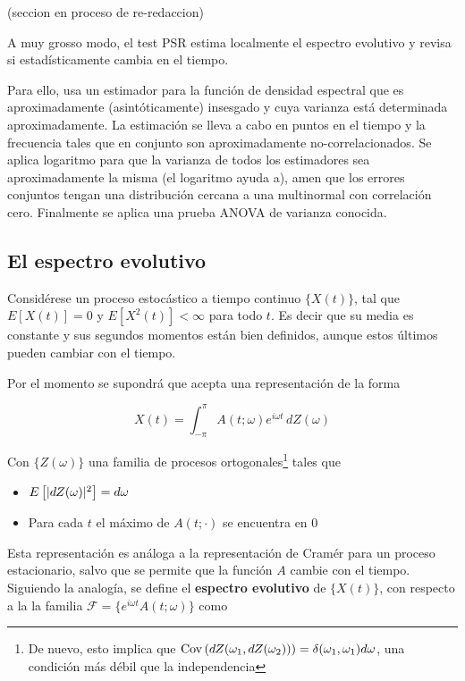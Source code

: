 (seccion en proceso de re-redaccion)

A muy grosso modo, el test PSR estima localmente  el espectro evolutivo
 y revisa si estad\'isticamente
cambia en el tiempo.

Para ello, usa un estimador para la funci\'on de densidad espectral
que es aproximadamente (asint\'oticamente) insesgado y cuya varianza est\'a
determinada aproximadamente. La estimaci\'on se lleva a cabo en puntos en el tiempo y
la frecuencia tales que en conjunto son aproximadamente no-correlacionados.
Se aplica logaritmo para que la varianza de todos los estimadores sea aproximadamente
la misma (el logaritmo ayuda a), amen que los errores conjuntos tengan una
distribuci\'on cercana a una multinormal con correlaci\'on cero.
Finalmente se aplica una prueba ANOVA de varianza conocida.


\subsection{El espectro evolutivo}

Consid\'erese un proceso estoc\'astico a tiempo continuo $\{X(t)\}$, tal que
$E[X(t)]=0$ y $E\left[ X^{2}(t)\right] < \infty$ para todo $t$. Es decir que su media es constante
y sus segundos momentos est\'an bien definidos, aunque 
estos \'ultimos pueden cambiar con el tiempo.

Por el momento se supondr\'a que acepta una representaci\'on de la forma

\begin{equation*}
X(t) = \int_{-\pi}^{\pi} A(t ; \omega) e^{i\omega t} \, d Z(\omega)
\end{equation*}

Con $\{ Z(\omega) \}$ una familia de procesos ortogonales\footnote{De nuevo, esto implica que
$\mathrm{Cov}\left( dZ(\omega_1,dZ(\omega_2)) \right) = \delta(\omega_1,\omega_1) d\omega$, una condici\'on m\'as
d\'ebil que la independencia} tales que

\begin{itemize}
\item $E \left[\lvert  dZ(\omega) \rvert^{2} \right] = d\omega$
\item Para cada $t$ el m\'aximo de $A(t;\cdot)$ se encuentra en 0
\end{itemize}

Esta representaci\'on es an\'aloga a la representaci\'on de Cram\'er para un proceso
estacionario, salvo que se permite que la funci\'on $A$ cambie con el tiempo.
Siguiendo la analog\'ia, se define 
el \textbf{espectro evolutivo} de $\{X(t)\}$, con respecto a la la familia
$\mathcal{F} = \{ e^{i\omega t} A(t; \omega) \}$
 como
 
